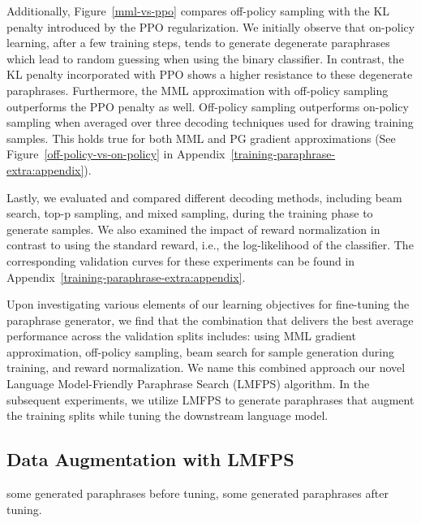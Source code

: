 \documentclass[11pt]{article}
\begin{document}
Additionally, Figure~\ref{mml-vs-ppo} compares off-policy sampling with the KL penalty introduced by the PPO regularization. We initially observe that on-policy learning, after a few training steps, tends to generate degenerate paraphrases which lead to random guessing when using the binary classifier. In contrast, the KL penalty incorporated with PPO shows a higher resistance to these degenerate paraphrases. Furthermore, the MML approximation with off-policy sampling outperforms the PPO penalty as well. Off-policy sampling outperforms on-policy sampling when averaged over three decoding techniques used for drawing training samples. This holds true for both MML and PG gradient approximations (See Figure~\ref{off-policy-vs-on-policy} in Appendix~\ref{training-paraphrase-extra:appendix}).

Lastly, we evaluated and compared different decoding methods, including beam search, top-p sampling, and mixed sampling, during the training phase to generate samples. We also examined the impact of reward normalization in contrast to using the standard reward, i.e., the log-likelihood of the classifier. The corresponding validation curves for these experiments can be found in Appendix~\ref{training-paraphrase-extra:appendix}.

Upon investigating various elements of our learning objectives for fine-tuning the paraphrase generator, we find that the combination that delivers the best average performance across the validation splits includes: using MML gradient approximation, off-policy sampling, beam search for sample generation during training, and reward normalization. We name this combined approach our novel Language Model-Friendly Paraphrase Search (LMFPS) algorithm. In the subsequent experiments, we utilize LMFPS to generate paraphrases that augment the training splits while tuning the downstream language model.

\subsection{Data Augmentation with LMFPS}
some generated paraphrases before tuning, some generated paraphrases after tuning.
\end{document}
